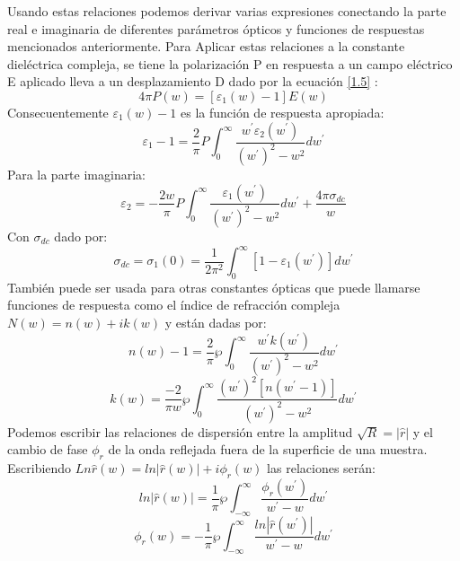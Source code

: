 \documentclass[a4paper,openright,12pt]{book}
\begin{document}
Usando estas relaciones podemos derivar varias expresiones conectando la parte real e imaginaria de diferentes parámetros ópticos y funciones de respuestas mencionados anteriormente. Para Aplicar estas relaciones a la constante dieléctrica compleja, se tiene la polarización P en respuesta a un campo eléctrico E aplicado lleva a un desplazamiento D dado por la ecuación  \ref{1.5} :
\begin{equation}
4\pi P(w)=[\varepsilon_{1}(w)-1]E(w)
\end{equation}
Consecuentemente $\varepsilon_{1}(w)-1$ es la función de respuesta apropiada:
\begin{equation}
\varepsilon_{1}-1=\frac{2}{\pi}P\int_{0}^{\infty}\frac{w^{'}\varepsilon_{2}(w^{'})}{(w^{'})^{2}-w^{2}}dw^{'}
\end{equation}
Para la parte imaginaria:
\begin{equation}
\varepsilon_{2}=-\frac{2w}{\pi}P\int_{0}^{\infty}\frac{\varepsilon_{1}(w^{'})}{(w^{'})^{2}-w^{2}}dw^{'}+\frac{4\pi\sigma
_{dc}}{w}
\end{equation}
Con $\sigma_{dc}$ dado por:
\begin{equation}
\sigma_{dc}=\sigma_{1}(0)=\frac{1}{2\pi^{2}}\int_{0}^{\infty}[1-\varepsilon_{1}(w^{'})]dw^{'}
\end{equation}
También puede ser usada para otras constantes ópticas que puede llamarse funciones de respuesta como el índice de refracción compleja $N(w)=n(w)+ik(w)$ y están dadas por:
\begin{equation}
n(w)-1=\frac{2}{\pi}\wp\int_{0}^{\infty}\frac{w^{'}k(w^{'})}{(w^{'})^{2}-w^{2}}dw^{'}
\end{equation}
\begin{equation}
k(w)=\frac{-2}{\pi w}\wp\int_{0}^{\infty}\frac{(w^{'})^{2}[n(w^{'}-1)]}{(w^{'})^{2}-w^{2}}dw^{'}
\end{equation}
Podemos escribir las relaciones de dispersión entre la amplitud $\sqrt{R}=|\hat{r}|$ y el cambio de fase $\phi_{r} $ de la onda reflejada fuera de la superficie de una muestra. Escribiendo $Ln \hat{r}(w)=ln|\hat{r}(w)|+i\phi_{r}(w)$ las relaciones serán:
\begin{equation}
ln|\hat{r}(w)|=\frac{1}{\pi}\wp\int_{-\infty}^{\infty}\frac{\phi_{r}(w^{'})}{w^{'}-w}dw^{'}
\end{equation}
\begin{equation}
\phi_{r}(w)=-\frac{1}{\pi}\wp\int_{-\infty}^{\infty}\frac{ln|\hat{r}(w^{'})|}{w^{'}-w}dw^{'}
\end{equation}
\end{document}
